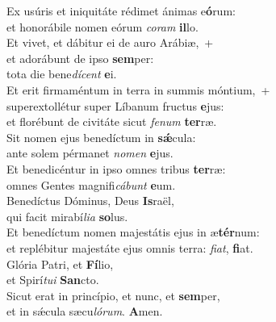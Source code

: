\evenverse Ex usúris et iniquitáte rédimet ánimas e\textbf{ó}rum:~\*\\
\evenverse et honorábile nomen eórum \textit{co}\textit{ram} \textbf{il}lo.\\
\oddverse Et vivet, et dábitur ei de auro Arábiæ,~+\\
\oddverse  et adorábunt de ipso \textbf{sem}per:~\*\\
\oddverse tota die bene\textit{dí}\textit{cent} \textbf{e}i.\\
\evenverse Et erit firmaméntum in terra in summis móntium,~+\\
\evenverse  superextollétur super Líbanum fructus \textbf{e}jus:~\*\\
\evenverse et florébunt de civitáte sicut \textit{fe}\textit{num} \textbf{ter}ræ.\\
\oddverse Sit nomen ejus benedíctum in \textbf{sǽ}cula:~\*\\
\oddverse ante solem pérmanet \textit{no}\textit{men} \textbf{e}jus.\\
\evenverse Et benedicéntur in ipso omnes tribus \textbf{ter}ræ:~\*\\
\evenverse omnes Gentes magnifi\textit{cá}\textit{bunt} \textbf{e}um.\\
\oddverse Benedíctus Dóminus, Deus \textbf{Is}raël,~\*\\
\oddverse qui facit mirabí\textit{li}\textit{a} \textbf{so}lus.\\
\evenverse Et benedíctum nomen majestátis ejus in æ\textbf{tér}num:~\*\\
\evenverse et replébitur majestáte ejus omnis terra: \textit{fi}\textit{at}, \textbf{fi}at.\\
\oddverse Glória Patri, et \textbf{Fí}lio,~\*\\
\oddverse et Spirí\textit{tu}\textit{i} \textbf{San}cto.\\
\evenverse Sicut erat in princípio, et nunc, et \textbf{sem}per,~\*\\
\evenverse et in sǽcula sæcu\textit{ló}\textit{rum}. \textbf{A}men.\\
